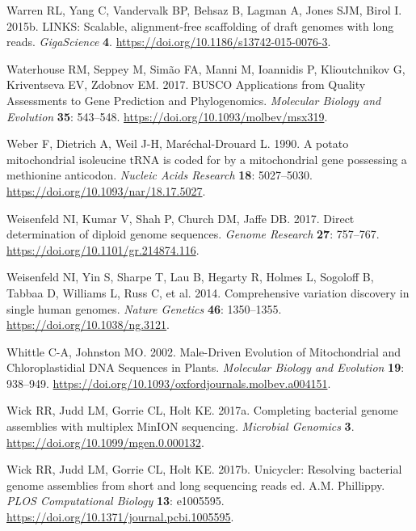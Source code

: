 \documentclass[
  12pt,
  oneside,
  openany]{book}
\begin{document}
\leavevmode\hypertarget{ref-Warren_2015_LINKS}{}%
Warren RL, Yang C, Vandervalk BP, Behsaz B, Lagman A, Jones SJM, Birol I. 2015b. LINKS: Scalable, alignment-free scaffolding of draft genomes with long reads. \emph{GigaScience} \textbf{4}. \url{https://doi.org/10.1186/s13742-015-0076-3}.

\leavevmode\hypertarget{ref-Waterhouse_2017}{}%
Waterhouse RM, Seppey M, Simão FA, Manni M, Ioannidis P, Klioutchnikov G, Kriventseva EV, Zdobnov EM. 2017. BUSCO Applications from Quality Assessments to Gene Prediction and Phylogenomics. \emph{Molecular Biology and Evolution} \textbf{35}: 543--548. \url{https://doi.org/10.1093/molbev/msx319}.

\leavevmode\hypertarget{ref-Weber_1990}{}%
Weber F, Dietrich A, Weil J-H, Maréchal-Drouard L. 1990. A potato mitochondrial isoleucine tRNA is coded for by a mitochondrial gene possessing a methionine anticodon. \emph{Nucleic Acids Research} \textbf{18}: 5027--5030. \url{https://doi.org/10.1093/nar/18.17.5027}.

\leavevmode\hypertarget{ref-Weisenfeld_2017}{}%
Weisenfeld NI, Kumar V, Shah P, Church DM, Jaffe DB. 2017. Direct determination of diploid genome sequences. \emph{Genome Research} \textbf{27}: 757--767. \url{https://doi.org/10.1101/gr.214874.116}.

\leavevmode\hypertarget{ref-Weisenfeld_2014}{}%
Weisenfeld NI, Yin S, Sharpe T, Lau B, Hegarty R, Holmes L, Sogoloff B, Tabbaa D, Williams L, Russ C, et al. 2014. Comprehensive variation discovery in single human genomes. \emph{Nature Genetics} \textbf{46}: 1350--1355. \url{https://doi.org/10.1038/ng.3121}.

\leavevmode\hypertarget{ref-Whittle_2002}{}%
Whittle C-A, Johnston MO. 2002. Male-Driven Evolution of Mitochondrial and Chloroplastidial DNA Sequences in Plants. \emph{Molecular Biology and Evolution} \textbf{19}: 938--949. \url{https://doi.org/10.1093/oxfordjournals.molbev.a004151}.

\leavevmode\hypertarget{ref-Wick_2017_Porechop}{}%
Wick RR, Judd LM, Gorrie CL, Holt KE. 2017a. Completing bacterial genome assemblies with multiplex MinION sequencing. \emph{Microbial Genomics} \textbf{3}. \url{https://doi.org/10.1099/mgen.0.000132}.

\leavevmode\hypertarget{ref-Wick_2017_Unicycler}{}%
Wick RR, Judd LM, Gorrie CL, Holt KE. 2017b. Unicycler: Resolving bacterial genome assemblies from short and long sequencing reads ed. A.M. Phillippy. \emph{PLOS Computational Biology} \textbf{13}: e1005595. \url{https://doi.org/10.1371/journal.pcbi.1005595}.
\end{document}
